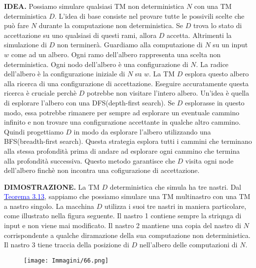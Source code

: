 \documentclass{article}
\begin{document}
\textbf{IDEA.}
Possiamo simulare qualsiasi TM non deterministica $N$ con una TM deterministica $D$.
L'idea di base consiste nel provare tutte le possivili scelte che può fare $N$ durante la computazione non deterministica.
Se $D$ trova lo stato di accettazione su uno qualsiasi di questi rami, allora $D$ accetta.
Altrimenti la simulazione di $D$ non terminerà.
Guardiamo alla computazione di $N$ su un input $w$ come ad un albero.
Ogni ramo dell'albero rappresenta una scelta non deterministica.
Ogni nodo dell'albero è una configurazione di $N$.
La radice dell'albero è la configurazione iniziale di $N$ su $w$.
La TM $D$ esplora questo albero alla ricerca di una configurazione di accettazione.
Eseguire accuratamente questa ricerca è cruciale perchè $D$ potrebbe non visitare l'intero albero.
Un'idea è quella di esplorare l'albero con una DFS(depth-first search).
Se $D$ esplorasse in questo modo, essa potrebbe rimanere per sempre ad esplorare un eventuale cammino infinito e non trovare una configurazione accettante in qualche altro cammino.
Quindi progettiamo $D$ in modo da esplorare l'albero utilizzando una BFS(breadth-first search).
Questa strategia esplora tutti i cammini che terminano alla stessa profondità prima di andare ad esplorare ogni cammino che termina alla profondità successiva.
Questo metodo garantisce che $D$ visita ogni node dell'albero finchè non incontra una cofigurazione di accettazione.
\vspace{1em}

\textbf{DIMOSTRAZIONE.}
La TM $D$ deterministica che simula ha tre nastri.
Dal \hyperref[th:da MdT multitape a single tape]{\textcolor{blue}{Teorema 3.13}}, sappiamo che possiamo simulare una TM multinastro con una TM a nastro singolo.
La macchina $D$ utilizza i suoi tre nastri in maniera particolare, come illustrato nella figura seguente.
Il nastro 1 contiene sempre la striqnga di input e non viene mai modificato.
Il nastro 2 mantiene una copia del nastro di $N$ corrispondente a qualche diramazione della sua computazione non deterministica.
Il nastro 3 tiene traccia della posizione di $D$ nell'albero delle computazioni di $N$.

\begin{figure}[H]
    \centering
    \texttt{[image: Immagini/66.png]}
    \label{fig:turing_machine_example2}
\end{figure}
\end{document}
